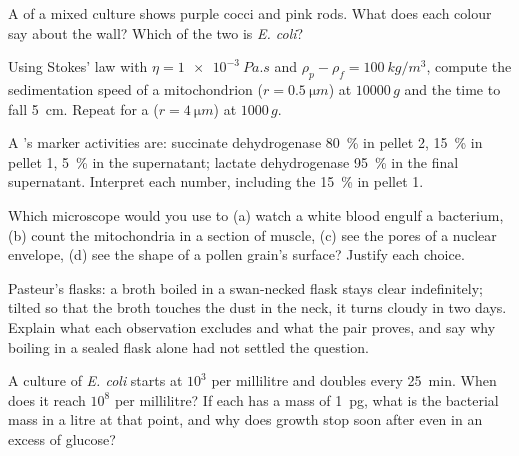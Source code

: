 \begin{exercise}[$\star\star$]\label{exo:b1:cell-unit-of-life:6}
A  of a mixed culture shows purple cocci and pink rods. What
does each colour say about the  wall? Which of the two is
\emph{E. coli}?
\end{exercise}

\begin{exercise}[$\star\star$]\label{exo:b1:cell-unit-of-life:7}
Using Stokes' law with $\eta = \qty{1e-3}{Pa.s}$ and $\rho_p - \rho_f =
\qty{100}{kg/m^3}$, compute the sedimentation speed of a mitochondrion
($r = \qty{0.5}{\micro m}$) at $\num{10000}\,g$ and the time to fall
\qty{5}{cm}. Repeat for a  ($r = \qty{4}{\micro m}$) at
$1000\,g$.
\end{exercise}

\begin{exercise}[$\star\star$]\label{exo:b1:cell-unit-of-life:8}
A 's marker activities are: succinate dehydrogenase
\qty{80}{\%} in pellet 2, \qty{15}{\%} in pellet 1, \qty{5}{\%} in the
supernatant; lactate dehydrogenase \qty{95}{\%} in the final
supernatant. Interpret each number, including the \qty{15}{\%} in
pellet 1.
\end{exercise}

\begin{exercise}[$\star\star$]\label{exo:b1:cell-unit-of-life:9}
Which microscope would you use to (a) watch a white blood  engulf
a bacterium, (b) count the mitochondria in a section of muscle, (c)
see the pores of a nuclear envelope, (d) see the shape of a pollen
grain's surface? Justify each choice.
\end{exercise}

\begin{exercise}[$\star\star\star$]\label{exo:b1:cell-unit-of-life:10}
Pasteur's flasks: a broth boiled in a swan-necked flask stays clear
indefinitely; tilted so that the broth touches the dust in the neck,
it turns cloudy in two days. Explain what each observation excludes
and what the pair proves, and say why boiling in a sealed flask alone
had not settled the question.
\end{exercise}

\begin{exercise}[$\star\star\star$]\label{exo:b1:cell-unit-of-life:11}
A culture of \emph{E. coli} starts at $10^3$  per millilitre and
doubles every \qty{25}{min}. When does it reach $10^8$ per millilitre?
If each  has a mass of \qty{1}{pg}, what is the bacterial mass in a
litre at that point, and why does growth stop soon after even in an
excess of glucose?
\end{exercise}

